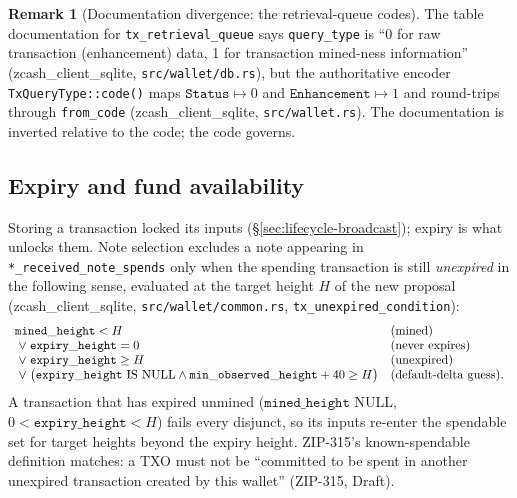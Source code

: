 \documentclass[11pt,a4paper]{article}
\theoremstyle{definition}
\newtheorem{remark}[theorem]{Remark}
\begin{document}
\begin{remark}[Documentation divergence: the retrieval-queue codes]
\label{rem:lifecycle-queue-doc}
The table documentation for \texttt{tx\_retrieval\_queue} says
\texttt{query\_type} is ``0 for raw transaction (enhancement) data, 1 for
transaction mined-ness information''
(\textsf{zcash\_client\_sqlite}, \texttt{src/wallet/db.rs}), but the
authoritative encoder \texttt{TxQueryType::code()} maps
$\texttt{Status} \mapsto 0$ and $\texttt{Enhancement} \mapsto 1$ and
round-trips through \texttt{from\_code}
(\textsf{zcash\_client\_sqlite}, \texttt{src/wallet.rs}). The
documentation is inverted relative to the code; the code governs.
\end{remark}

\subsection{Expiry and fund availability}\label{sec:lifecycle-funds}

Storing a transaction locked its inputs (\S\ref{sec:lifecycle-broadcast});
expiry is what unlocks them. Note selection excludes a note appearing in
\texttt{*\_received\_note\_spends} only when the spending transaction is
still \emph{unexpired} in the following sense, evaluated at the target
height $H$ of the new proposal
(\textsf{zcash\_client\_sqlite}, \texttt{src/wallet/common.rs},
\texttt{tx\_unexpired\_condition}):
\begin{equation}\label{eq:unexpired}
\begin{array}{l@{\quad}l}
\mathtt{mined\_height} < H
  & \text{(mined)} \\
\;\vee\; \mathtt{expiry\_height} = 0
  & \text{(never expires)} \\
\;\vee\; \mathtt{expiry\_height} \ge H
  & \text{(unexpired)} \\
\;\vee\; \bigl(\mathtt{expiry\_height} \text{ IS NULL} \wedge
  \mathtt{min\_observed\_height} + 40 \ge H\bigr)
  & \text{(default-delta guess).}
\end{array}
\end{equation}
A transaction that has expired unmined ($\mathtt{mined\_height}$ NULL,
$0 < \mathtt{expiry\_height} < H$) fails every disjunct, so its inputs
re-enter the spendable set for target heights beyond the expiry height.
ZIP-315's known-spendable definition matches: a TXO must not be
``committed to be spent in another unexpired transaction created by this
wallet'' (ZIP-315, Draft).
\end{document}
